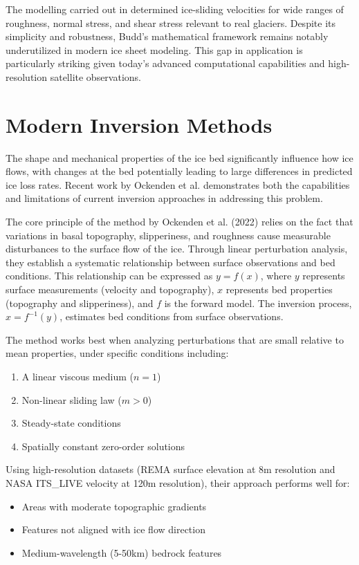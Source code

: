 The modelling carried out in\cite{Budd_1970} determined ice-sliding velocities for wide ranges of roughness, normal stress, and shear stress relevant to real glaciers\cite{Budd_1970}. Despite its simplicity and robustness, Budd's mathematical framework remains notably underutilized in modern ice sheet modeling. This gap in application is particularly striking given today's advanced computational capabilities and high-resolution satellite observations. 

\section{Modern Inversion Methods}\label{Ockenden_2022}

The shape and mechanical properties of the ice bed significantly influence how ice flows, with changes at the bed potentially leading to large differences in predicted ice loss rates\cite{Ockenden_2022}. Recent work by Ockenden et al. demonstrates both the capabilities and limitations of current inversion approaches in addressing this problem.

The core principle of the method by Ockenden et al. (2022) relies on the fact that variations in basal topography, slipperiness, and roughness cause measurable disturbances to the surface flow of the ice. Through linear perturbation analysis, they establish a systematic relationship between surface observations and bed conditions. This relationship can be expressed as $y=f(x)$, where $y$ represents surface measurements (velocity and topography), $x$ represents bed properties (topography and slipperiness), and $f$ is the forward model\cite{Gudmundsson_2008}. The inversion process, $x=f^{-1}(y)$, estimates bed conditions from surface observations.

The method works best when analyzing perturbations that are small relative to mean properties, under specific conditions including:
\begin{enumerate}
    \item A linear viscous medium ($n=1$)
    \item Non-linear sliding law ($m>0$)
    \item Steady-state conditions
    \item Spatially constant zero-order solutions
\end{enumerate}

Using high-resolution datasets (REMA surface elevation at 8m resolution and NASA ITS\_LIVE velocity at 120m resolution), their approach performs well for:
\begin{itemize}
    \item Areas with moderate topographic gradients
    \item Features not aligned with ice flow direction
    \item Medium-wavelength (5-50km) bedrock features
\end{itemize}

